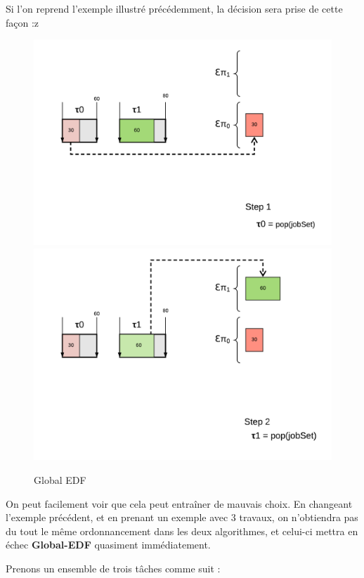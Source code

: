 	Si l'on reprend l'exemple illustré précédemment, la décision sera prise de cette façon :z
	
	\begin{figure}[H]
		\includegraphics[scale=0.5]{img/gedf/gedf}
		\includegraphics[scale=0.5]{img/gedf/gedf2}
		\caption{Global EDF}
	\end{figure}
	 
	On peut facilement voir que cela peut entraîner de \og{}mauvais choix\fg{}. 
	En changeant l'exemple précédent, et en prenant un exemple avec 3 travaux, 
	on n'obtiendra pas du tout le même ordonnancement dans les deux algorithmes, 
	et celui-ci mettra en échec \textbf{Global-EDF} quasiment immédiatement.\newline
	
	Prenons un ensemble de trois tâches comme suit :

